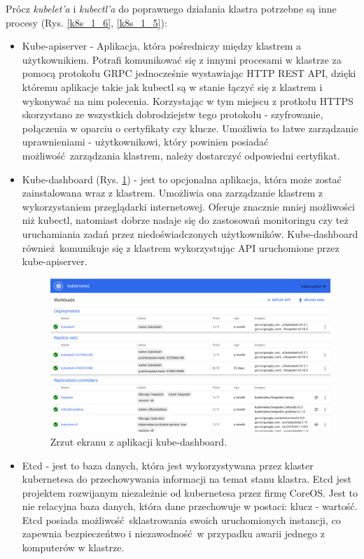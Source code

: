 \documentclass[10pt,a4paper,titlepage,twoside]{report}
\begin{document}
Prócz \textit{kubelet'a} i \textit{kubectl'a} do poprawnego działania klastra potrzebne są inne procesy (Rys. \ref{k8s_1_6}, \ref{k8s_1_5}):
\begin{itemize}
\item Kube-apiserver - Aplikacja, która pośredniczy między klastrem a użytkownikiem. Potrafi komunikować się z innymi procesami w klastrze za pomocą protokołu GRPC jednocześnie wystawiając HTTP REST API, dzięki któremu aplikacje takie jak kubectl są w stanie łączyć się z klastrem i wykonywać na nim polecenia. Korzystając w tym miejscu z protkołu HTTPS skorzystano ze wszystkich dobrodziejstw tego protokołu - szyfrowanie, połączenia w oparciu o certyfikaty czy klucze. Umożliwia to łatwe zarządzanie uprawnieniami - użytkownikowi, który powinien posiadać możliwość zarządzania klastrem, należy dostarczyć odpowiedni certyfikat.
\item Kube-dashboard (Rys. \ref{k8s_dash}) - jest to opcjonalna aplikacja, która może zostać zainstalowana wraz z klastrem. Umożliwia ona zarządzanie klastrem z wykorzystaniem przeglądarki internetowej. Oferuje znacznie mniej możliwości niż kubectl, natomiast dobrze nadaje się do zastosowań monitoringu czy też uruchamiania zadań przez niedoświadczonych użytkowników. Kube-dashboard również komunikuje się z klastrem wykorzystując API uruchomione przez kube-apiserver.
\begin{figure}[!h]
	\centering
	\includegraphics[scale=0.17]{pics/kubedash.png}
	\caption{Zrzut ekranu z aplikacji kube-dashboard.}
	\label{k8s_dash}
\end{figure}
\item Etcd - jest to baza danych, która jest wykorzystywana przez klaster kubernetesa do przechowywania informacji na temat stanu klastra. Etcd jest projektem rozwijanym niezależnie od kubernetesa przez firmę CoreOS. Jest to nie relacyjna baza danych, która dane przechowuje w postaci: klucz - wartość. Etcd posiada możliwość sklastrowania swoich uruchomionych instancji, co zapewnia bezpieczeńtwo i niezawodność w przypadku awarii jednego z komputerów w klastrze.

\end{itemize}
\end{document}
